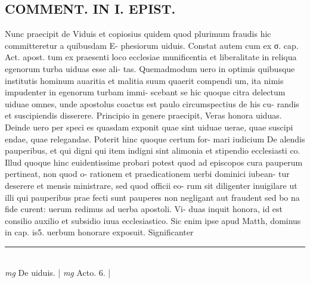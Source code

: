 \documentclass{article}
\begin{document}
\begin{pages}
\section*{COMMENT. IN I. EPIST. }\pstart Nunc praecipit de Viduis et copiosius quidem quod plurimum fraudis hic committeretur a quibusdam E- phesiorum uiduis. Constat autem cum ex σ. cap. Act. apost. tum ex praesenti loco ecclesiae munificentia et liberalitate in reliqua egenorum turba uiduas esse ali- tas. Quemadmodum uero in optimis quibusque institutis hominum auaritia et malitia suum quaerit compendi um, ita nimis impudenter in egenorum turbam immi- scebant se hic quoque citra delectum uiduae omnes, unde apostolus coactus est paulo circumspectius de his cu- randis et suscipiendis disserere. Principio in genere praecipit, Veras honora uiduas. Deinde uero per speci es quasdam exponit quae sint uiduae uerae, quae suscipi endae, quae relegandae. Poterit hinc quoque certum for- mari iudicium De alendis pauperibus, et qui digni qui item indigni sint alimonia et stipendio ecclesiasti co. Illud quoque hinc euidentissime probari potest quod ad episcopos cura pauperum pertineat, non quod o- rationem et praedicationem uerbi dominici iubean- tur deserere et mensis ministrare, sed quod officii eo- rum sit diligenter inuigilare ut illi qui pauperibus prae fecti sunt pauperes non negligant aut fraudent sed bo na fide curent: uerum redimus ad uerba apostoli. Vi- duas inquit honora, id est consilio auxilio et subsidio iuua ecclesiastico. Sic enim ipse apud Matth, dominus in cap. is5. uerbum honorare exposuit. Significanter  \pend
\vspace{0.5cm}\noindent
\vspace{0.2cm}\rule{1cm}{0.2pt}\\ 
\hspace{0.2cm}\textit{mg}
\footnotesize De uiduis. 
\normalsize| 
\hspace{0.2cm}\textit{mg}
\footnotesize Acto. 6. 
\normalsize| 

\end{pages}
\end{document}
